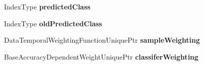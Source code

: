 \begin{DoxyCompactItemize}
\item 
\hypertarget{classffactory_1_1_stream_prox_cache_a0eaba2e04cfbdb35089fb9ce39e84838}{Index\-Type {\bfseries predicted\-Class}}\label{classffactory_1_1_stream_prox_cache_a0eaba2e04cfbdb35089fb9ce39e84838}

\item 
\hypertarget{classffactory_1_1_stream_prox_cache_adc739434e0cfc254d08875539a94fb91}{Index\-Type {\bfseries old\-Predicted\-Class}}\label{classffactory_1_1_stream_prox_cache_adc739434e0cfc254d08875539a94fb91}

\item 
\hypertarget{classffactory_1_1_stream_prox_cache_aff73cce3f37ae42a053df701d3f3fd45}{Data\-Temporal\-Weighting\-Function\-Unique\-Ptr {\bfseries sample\-Weighting}}\label{classffactory_1_1_stream_prox_cache_aff73cce3f37ae42a053df701d3f3fd45}

\item 
\hypertarget{classffactory_1_1_stream_prox_cache_adbeed613bb3e9526de614e1f978cbfbd}{Base\-Accuracy\-Dependent\-Weight\-Unique\-Ptr {\bfseries classifer\-Weighting}}\label{classffactory_1_1_stream_prox_cache_adbeed613bb3e9526de614e1f978cbfbd}

\end{DoxyCompactItemize}


